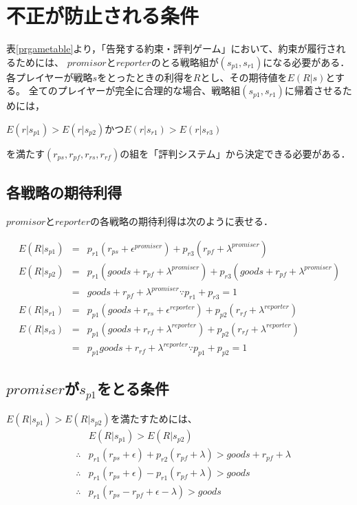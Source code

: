 \section{不正が防止される条件}
表\ref{prgametable}より，「告発する約束・評判ゲーム」において、約束が履行されるためには、
$promisor$と$reporter$のとる戦略組が$ (s_{p1}, s_{r1})$になる必要がある．
各プレイヤーが戦略$s$をとったときの利得を$R$とし、その期待値を$E(R|s)$とする。
全てのプレイヤーが完全に合理的な場合、戦略組$(s_{p1}, s_{r1})$に帰着させるためには，

\begin{description}
  \centering
  \item[条件③] $E(r|s_{p1}) > E(r|s_{p2})$かつ$E(r|s_{r1}) > E(r|s_{r3})$
\end{description}

を満たす$(r_{ps}, r_{pf}, r_{rs}, r_{rf})$の組を「評判システム」から決定できる必要がある．

\subsection{各戦略の期待利得}
$promisor$と$reporter$の各戦略の期待利得は次のように表せる．

\begin{eqnarray}
  E(R|s_{p1}) &=& p_{r1} (r_{ps} + \epsilon^{promiser}) + p_{r3} (r_{pf} + \lambda^{promiser}) \\
  E(R|s_{p2}) &=& p_{r1} (goods + r_{pf} + \lambda^{promiser}) + p_{r3} (goods + r_{pf} + \lambda^{promiser}) \\
              &=& goods + r_{pf} + \lambda^{promiser} \because p_{r1} + p_{r3} = 1 \\
  E(R|s_{r1}) &=& p_{p1} (goods + r_{rs} + \epsilon^{reporter}) + p_{p2} (r_{rf} + \lambda^{reporter}) \\
  E(R|s_{r3}) &=& p_{p1}(goods+r_{rf} + \lambda^{reporter}) + p_{p2} (r_{rf} + \lambda^{reporter}) \\
              &=& p_{p1} goods + r_{rf} + \lambda^{reporter} \because p_{p1} + p_{p2} = 1
\end{eqnarray}


\subsection{$promiser$が$s_{p1}$をとる条件}

$ E(R|s_{p1}) > E(R|s_{p2}) $を満たすためには、
\begin{eqnarray*}
  &&E(R|s_{p1}) > E(R|s_{p2}) \\
  &\therefore& p_{r1} (r_{ps} + \epsilon) + p_{r2} (r_{pf} + \lambda) > goods + r_{pf} + \lambda \\
  &\therefore& p_{r1}(r_{ps} + \epsilon) - p_{r1}(r_{pf} + \lambda) > goods \\
  &\therefore& p_{r1}(r_{ps} - r_{pf} + \epsilon - \lambda) > goods
\end{eqnarray*}

